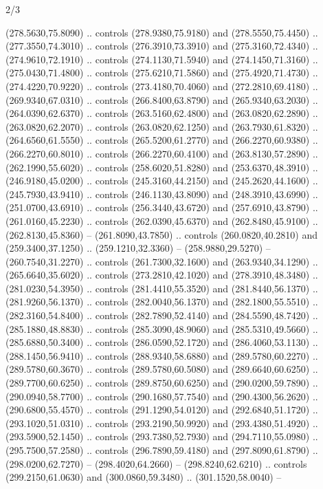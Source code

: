 \begin{flagdescription}{2/3}
\begin{scope}[xshift=0.5\flaglength,yshift=0.5\flagwidth,scale=\stretchfactor]
\begin{scope}[scale=0.001645\flagwidth,yshift=65mm,xshift=-63mm]
\begin{scope}[y=0.80pt, x=0.80pt, yscale=-1,]
\begin{scope}[cm={{1.33333,0.0,0.0,1.33333,(0.0,1e-05)}}]
  (278.5630,75.8090) .. controls (278.9380,75.9180) and (278.5550,75.4450) ..
  (277.3550,74.3010) .. controls (276.3910,73.3910) and (275.3160,72.4340) ..
  (274.9610,72.1910) .. controls (274.1130,71.5940) and (274.1450,71.3160) ..
  (275.0430,71.4800) .. controls (275.6210,71.5860) and (275.4920,71.4730) ..
  (274.4220,70.9220) .. controls (273.4180,70.4060) and (272.2810,69.4180) ..
  (269.9340,67.0310) .. controls (266.8400,63.8790) and (265.9340,63.2030) ..
  (264.0390,62.6370) .. controls (263.5160,62.4800) and (263.0820,62.2890) ..
  (263.0820,62.2070) .. controls (263.0820,62.1250) and (263.7930,61.8320) ..
  (264.6560,61.5550) .. controls (265.5200,61.2770) and (266.2270,60.9380) ..
  (266.2270,60.8010) .. controls (266.2270,60.4100) and (263.8130,57.2890) ..
  (262.1990,55.6020) .. controls (258.6020,51.8280) and (253.6370,48.3910) ..
  (246.9180,45.0200) .. controls (245.3160,44.2150) and (245.2620,44.1600) ..
  (245.7930,43.9410) .. controls (246.1130,43.8090) and (248.3910,43.6990) ..
  (251.0700,43.6910) .. controls (256.3440,43.6720) and (257.6910,43.8790) ..
  (261.0160,45.2230) .. controls (262.0390,45.6370) and (262.8480,45.9100) ..
  (262.8130,45.8360) -- (261.8090,43.7850) .. controls (260.0820,40.2810) and
  (259.3400,37.1250) .. (259.1210,32.3360) -- (258.9880,29.5270) --
  (260.7540,31.2270) .. controls (261.7300,32.1600) and (263.9340,34.1290) ..
  (265.6640,35.6020) .. controls (273.2810,42.1020) and (278.3910,48.3480) ..
  (281.0230,54.3950) .. controls (281.4410,55.3520) and (281.8440,56.1370) ..
  (281.9260,56.1370) .. controls (282.0040,56.1370) and (282.1800,55.5510) ..
  (282.3160,54.8400) .. controls (282.7890,52.4140) and (284.5590,48.7420) ..
  (285.1880,48.8830) .. controls (285.3090,48.9060) and (285.5310,49.5660) ..
  (285.6880,50.3400) .. controls (286.0590,52.1720) and (286.4060,53.1130) ..
  (288.1450,56.9410) .. controls (288.9340,58.6880) and (289.5780,60.2270) ..
  (289.5780,60.3670) .. controls (289.5780,60.5080) and (289.6640,60.6250) ..
  (289.7700,60.6250) .. controls (289.8750,60.6250) and (290.0200,59.7890) ..
  (290.0940,58.7700) .. controls (290.1680,57.7540) and (290.4300,56.2620) ..
  (290.6800,55.4570) .. controls (291.1290,54.0120) and (292.6840,51.1720) ..
  (293.1020,51.0310) .. controls (293.2190,50.9920) and (293.4380,51.4920) ..
  (293.5900,52.1450) .. controls (293.7380,52.7930) and (294.7110,55.0980) ..
  (295.7500,57.2580) .. controls (296.7890,59.4180) and (297.8090,61.8790) ..
  (298.0200,62.7270) -- (298.4020,64.2660) -- (298.8240,62.6210) .. controls
  (299.2150,61.0630) and (300.0860,59.3480) .. (301.1520,58.0040) --

\end{scope}
\end{scope}
\end{scope}
\end{scope}
\end{flagdescription}
